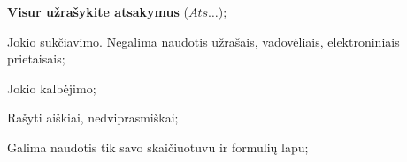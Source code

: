 \documentclass[a4paper]{article}
\begin{document}
\begin{enumerate}
\end{enumerate}

\begin{small}
      \begin{enumerate*}[label={(\arabic*)}]
            \item \textbf{Visur užrašykite atsakymus} ($Ats\ldots$);
            \item Jokio sukčiavimo. Negalima naudotis užrašais, vadovėliais,
            elektroniniais prietaisais;
            \item Jokio kalbėjimo;
            \item Rašyti aiškiai, nedviprasmiškai;
            \item Galima naudotis tik savo skaičiuotuvu ir formulių lapu;
      \end{enumerate*}
\end{small}
\end{document}
